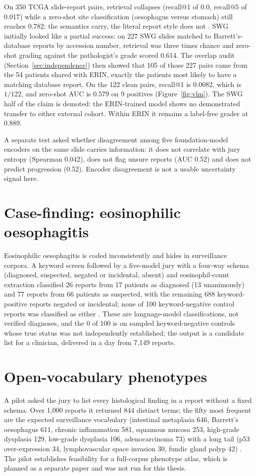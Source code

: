 On 350 TCGA slide-report pairs, retrieval collapses (recall@1 of 0.0, recall@5 of 0.017) while a zero-shot site classification (oesophagus versus stomach) still reaches 0.782: the semantics carry, the literal report style does not . SWG initially looked like a partial success: on 227 SWG slides matched to Barrett's-database reports by accession number, retrieval was three times chance and zero-shot grading against the pathologist's grade scored 0.614. The overlap audit (Section~\ref{sec:independence}) then showed that 105 of those 227 pairs came from the 54 patients shared with ERIN, exactly the patients most likely to have a matching database report. On the 122 clean pairs, recall@1 is 0.0082, which is $1/122$, and zero-shot AUC is 0.579 on 9 positives (Figure~\ref{fig:vlm}). The SWG half of the claim is demoted: the ERIN-trained model shows no demonstrated transfer to either external cohort. Within ERIN it remains a label-free grader at 0.889.

A separate test asked whether disagreement among five foundation-model encoders on the same slide carries information: it does not correlate with jury entropy (Spearman 0.042), does not flag unsure reports (AUC 0.52) and does not predict progression (0.52). Encoder disagreement is not a usable uncertainty signal here.

\section{Case-finding: eosinophilic oesophagitis}

Eosinophilic oesophagitis is coded inconsistently and hides in surveillance corpora. A keyword screen followed by a five-model jury with a four-way schema (diagnosed, suspected, negated or incidental, absent) and eosinophil-count extraction classified 26 reports from 17 patients as diagnosed (13 unanimously) and 77 reports from 66 patients as suspected, with the remaining 688 keyword-positive reports negated or incidental; none of 100 keyword-negative control reports was classified as either . These are language-model classifications, not verified diagnoses, and the 0 of 100 is on sampled keyword-negative controls whose true status was not independently established; the output is a candidate list for a clinician, delivered in a day from 7,149 reports.

\section{Open-vocabulary phenotypes}

A pilot asked the jury to list every histological finding in a report without a fixed schema. Over 1,000 reports it returned 844 distinct terms; the fifty most frequent are the expected surveillance vocabulary (intestinal metaplasia 646, Barrett's oesophagus 611, chronic inflammation 581, squamous mucosa 253, high-grade dysplasia 129, low-grade dysplasia 106, adenocarcinoma 73) with a long tail (p53 over-expression 34, lymphovascular space invasion 30, fundic gland polyp 42) . The pilot establishes feasibility for a full-corpus phenotype atlas, which is planned as a separate paper and was not run for this thesis.
